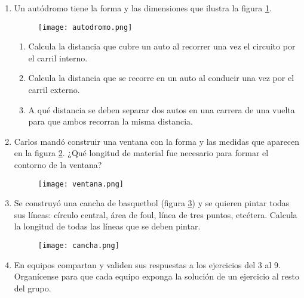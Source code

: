 \begin{enumerate}
    \item Un autódromo tiene la forma y las dimensiones que ilustra la figura \ref{fig:autodromo}.
          \begin{figure}[H]
              \centering
              \texttt{[image: autodromo.png]}
              \label{fig:autodromo}
          \end{figure}
          \begin{enumerate}
              \item Calcula la distancia que cubre un auto al recorrer una vez el circuito por el carril interno.\\
              \item Calcula la distancia que se recorre en un auto al conducir una vez por el carril externo.\\
              \item A qué distancia se deben separar dos autos en una carrera de una vuelta para que ambos recorran la misma distancia.
          \end{enumerate}
    \item Carlos mandó construir una ventana con la forma y las medidas que aparecen en
          la figura \ref{fig:ventana}. ¿Qué longitud de material fue necesario para formar el contorno de la ventana?

          \begin{figure}[H]
              \centering
              \texttt{[image: ventana.png]}
              \label{fig:ventana}
          \end{figure}
          \newpage
    \item Se construyó una cancha de basquetbol (figura \ref{fig:cancha}) y se quieren pintar todas sus
          líneas: círculo central, área de foul, línea de tres puntos, etcétera. Calcula la longitud de todas las líneas que se deben pintar.
          \begin{figure}[H]
              \centering
              \texttt{[image: cancha.png]}
              \label{fig:cancha}
          \end{figure}

    \item En equipos compartan y validen sus respuestas a los ejercicios del 3 al 9. Organícense
          para que cada equipo exponga la solución de un ejercicio al resto del grupo.
\end{enumerate}


